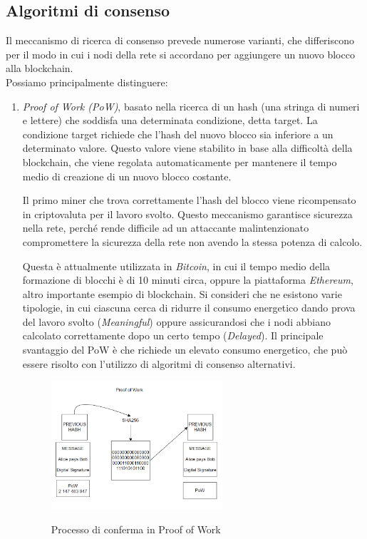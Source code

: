 \subsection{Algoritmi di consenso}\label{sec:tecnologie-blockchain-algoritmi}
Il meccanismo di ricerca di consenso prevede numerose varianti, che differiscono per il modo in cui i nodi della rete si accordano per aggiungere un nuovo blocco alla blockchain.\\
Possiamo principalmente distinguere:
\begin{enumerate}
    \item\textit{{Proof of Work (PoW)}}, basato nella ricerca di un hash (una stringa di numeri e lettere) che soddisfa una determinata condizione, detta target. La condizione target richiede 
    che l'hash del nuovo blocco sia inferiore a un determinato valore. Questo valore viene stabilito in base alla difficoltà della blockchain, che viene regolata automaticamente per mantenere 
    il tempo medio di creazione di un nuovo blocco costante. 

    Il primo miner che trova correttamente l'hash del blocco viene ricompensato in criptovaluta per il lavoro svolto.
    Questo meccanismo garantisce sicurezza nella rete, perché rende difficile ad un attaccante malintenzionato
    compromettere la sicurezza della rete non avendo la stessa potenza di calcolo.
    
    Questa è attualmente utilizzata in \textit{Bitcoin}, in cui il tempo medio della formazione di blocchi è di 10 minuti circa, oppure la piattaforma \textit{Ethereum}, altro importante esempio di blockchain.
    Si consideri che ne esistono varie tipologie, in cui ciascuna cerca di ridurre il consumo energetico dando prova del lavoro svolto (\textit{Meaningful}) oppure assicurandosi che
    i nodi abbiano calcolato correttamente dopo un certo tempo (\textit{Delayed}).
    Il principale svantaggio del PoW è che richiede un elevato consumo energetico, che può essere risolto con l'utilizzo di algoritmi di consenso alternativi.

    \begin{figure}[h]
        \centering
        \includegraphics[width=0.6\textwidth, alt={Come avviene il processo di conferma in Proof of Work}]{immagini/proof-of-work.png}
        \caption{Processo di conferma in Proof of Work}
    \end{figure}


\end{enumerate}
